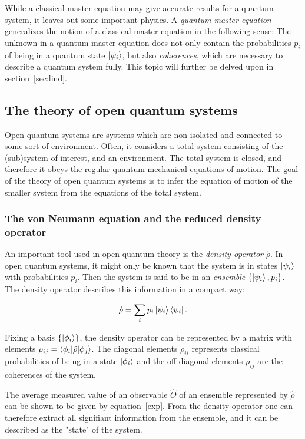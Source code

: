 \documentclass[../main.tex]{subfiles}
\begin{document}
While a classical master equation may give accurate results for a quantum system, it leaves out some important physics. A \textit{quantum master equation} generalizes the notion of a classical master equation in the following sense: The unknown in a quantum master equation does not only contain the probabilities $p_i$ of being in a quantum state $\ket{\psi_i}$, but also \textit{coherences}, which are necessary to describe a quantum system fully. This topic will further be delved upon in section~\ref{sec:lind}.
\subsection{The theory of open quantum systems}
Open quantum systems are systems which are non-isolated and connected to some sort of environment. Often, it considers a total system consisting of the (sub)system of interest, and an environment. The total system is closed, and therefore it obeys the regular quantum mechanical equations of motion. The goal of the theory of open quantum systems is to infer the equation of motion of the smaller system from the equations of the total system. 

\subsubsection{The von Neumann equation and the reduced density operator}

An important tool used in open quantum theory is the \textit{density operator} $\hat{\rho}$. In open quantum systems, it might only be known that the system is in states $\ket{\psi_i}$ with probabilities $p_i$. Then the system is said to be in an \textit{ensemble} $\{\ket{\psi_i}, p_i\}$. The density operator describes this information in a compact way:

\begin{equation}
    \hat{\rho} = \sum_i p_i \ket{\psi_i}\bra{\psi_i}.
\end{equation}

Fixing a basis $\{\ket{\phi_i}\}$, the density operator can be represented by a matrix with elements $\rho_{ij} = \braket{\phi_i|\hat\rho|\phi_j}$. The diagonal elements $\rho_{ii}$ represents classical probabilities of being in a state $\ket{\phi_i}$ and the off-diagonal elements $\rho_{ij}$ are the coherences of the system.

The average measured value of an observable $\hat O$ of an ensemble represented by $\hat\rho$ can be shown to be given by equation~\eqref{exp}. From the density operator one can therefore extract all signifiant information from the ensemble, and it can be described as the "state" of the system.
\end{document}
